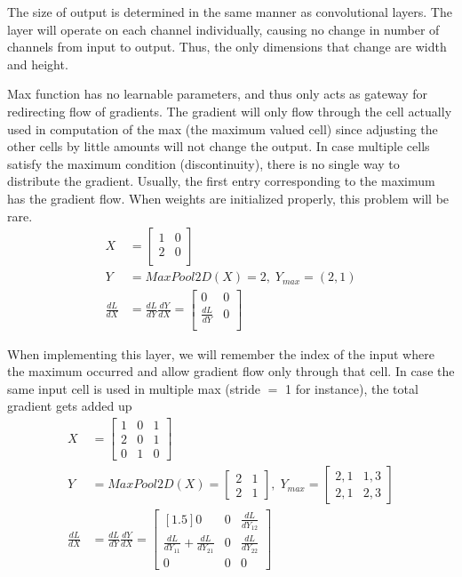 \documentclass[../../deep_learning_notes.tex]{subfiles}
\begin{document}
The size of output is determined in the same manner as convolutional layers. The layer will operate on each channel individually, causing no change in number of channels from input to output. Thus, the only dimensions that change are width and height.\newline

Max function has no learnable parameters, and thus only acts as gateway for redirecting flow of gradients. The gradient will only flow through the cell actually used in computation of the max (the maximum valued cell) since adjusting the other cells by little amounts will not change the output.\newline
In case multiple cells satisfy the maximum condition (discontinuity), there is no single way to distribute the gradient. Usually, the first entry corresponding to the maximum has the gradient flow. When weights are initialized properly, this problem will be rare.
\begin{align*}
    X &= \begin{bmatrix} 1 &0\\ 2 &0\\\end{bmatrix}\\
    Y &= MaxPool2D(X) = 2, \; Y_{max} = (2,1)\\
    \frac{dL}{dX} &= \frac{dL}{dY}\frac{dY}{dX}
    = \begin{bmatrix} 0 &0\\ \frac{dL}{dY} &0\\\end{bmatrix}
\end{align*}

When implementing this layer, we will remember the index of the input where the maximum occurred and allow gradient flow only through that cell. In case the same input cell is used in multiple max (stride $=$ 1 for instance), the total gradient gets added up
\begin{align*}
    X &= \begin{bmatrix} 1 &0 &1\\ 2 &0 &1\\ 0 &1 &0\end{bmatrix}\\
    Y &= MaxPool2D(X) = \begin{bmatrix} 2 &1\\ 2 &1\end{bmatrix}, \; Y_{max} = \begin{bmatrix} 2,1 &1,3\\ 2,1 &2,3\end{bmatrix}\\
    \frac{dL}{dX} &= \frac{dL}{dY}\frac{dY}{dX}
    = \begin{bmatrix}[1.5] 0 &0 &\frac{dL}{dY_{12}}\\ \frac{dL}{dY_{11}} + \frac{dL}{dY_{21}} &0 &\frac{dL}{dY_{22}}\\ 0 &0 &0\end{bmatrix}
\end{align*}
\end{document}
